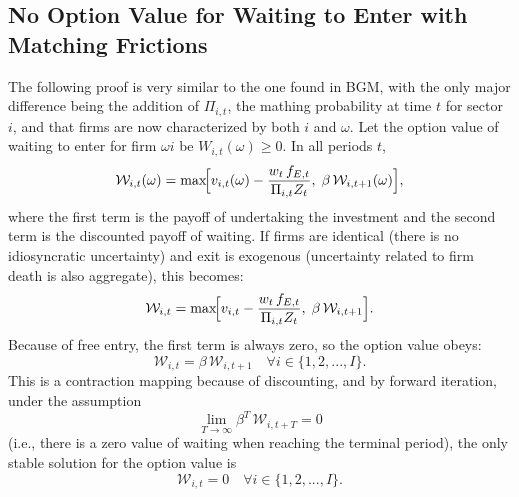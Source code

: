 \documentclass[a4paper,12pt]{article} %
\numberwithin{equation}{section} %
\numberwithin{figure}{section}
\numberwithin{table}{section}
\begin{document}
\begin{refsection}
\begin{appendices}
\pagebreak
\section{No Option Value for Waiting to Enter with Matching Frictions}
\label{sec-app:option}

The following proof is very similar to the one found in BGM, with the only major difference being the addition of $\Pi_{i,t}$,
the mathing probability at time $t$ for sector $i$, and that firms are now characterized by both $i$ and $\omega$.
Let the option value of waiting to enter for firm $\omega i$ be $W_{i,t}(\omega)\ge0$. In all periods $t$,
\[
\mathcal{W}_{i,t}(\omega)
=\max\!\Bigl[v_{i,t}(\omega)-\frac{w_t\,f_{E,t}}{\Pi_{i,t}Z_t},\;\beta\,\mathcal{W}_{i,t+1}(\omega)\Bigr],
\]
where the first term is the payoff of undertaking the investment and the second term is the discounted payoff of waiting. 
If firms are identical (there is no idiosyncratic uncertainty) and exit is exogenous (uncertainty related to firm death is also aggregate), this becomes:
\[
\mathcal{W}_{i,t}
=\max\!\Bigl[v_{i,t}-\frac{w_t\,f_{E,t}}{\Pi_{i,t}Z_t},\;\beta\,\mathcal{W}_{i,t+1}\Bigr].
\]
Because of free entry, the first term is always zero, so the option value obeys:
\[
\mathcal{W}_{i,t} = \beta\,\mathcal{W}_{i,t+1} \quad \forall i \in \{1,2,...,I\}.
\]
This is a contraction mapping because of discounting, and by forward iteration, under the assumption
\[
\lim_{T\to\infty}\beta^T\,\mathcal{W}_{i,t+T}=0
\]
(i.e., there is a zero value of waiting when reaching the terminal period), the only stable solution for the option value is
\[
\mathcal{W}_{i,t} = 0 \quad \forall i \in \{1,2,...,I\}.
\]

\pagebreak

\end{appendices}
\thispagestyle{plain}
\renewcommand*{\thepage}{A-\Roman{page}} %

\printbibliography[heading=subbibliography, title={Appendix References}]
\thispagestyle{plain}
\cleardoublepage %

\end{refsection}
\end{document}
